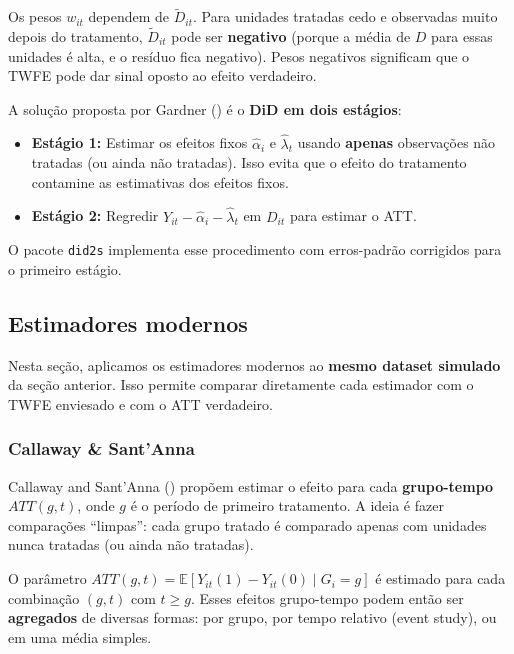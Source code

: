 \documentclass[
]{article}
\begin{document}
Os pesos \(w_{it}\) dependem de \(\tilde{D}_{it}\). Para unidades tratadas cedo e observadas muito depois do tratamento, \(\tilde{D}_{it}\) pode ser \textbf{negativo} (porque a média de \(D\) para essas unidades é alta, e o resíduo fica negativo). Pesos negativos significam que o TWFE pode dar sinal oposto ao efeito verdadeiro.

A solução proposta por Gardner () é o \textbf{DiD em dois estágios}:

\begin{itemize}
\item
  \textbf{Estágio 1:} Estimar os efeitos fixos \(\hat{\alpha}_i\) e \(\hat{\lambda}_t\) usando \textbf{apenas} observações não tratadas (ou ainda não tratadas). Isso evita que o efeito do tratamento contamine as estimativas dos efeitos fixos.
\item
  \textbf{Estágio 2:} Regredir \(Y_{it} - \hat{\alpha}_i - \hat{\lambda}_t\) em \(D_{it}\) para estimar o ATT.
\end{itemize}

O pacote \texttt{did2s} implementa esse procedimento com erros-padrão corrigidos para o primeiro estágio.

\subsection{Estimadores modernos}\label{estimadores-modernos}

Nesta seção, aplicamos os estimadores modernos ao \textbf{mesmo dataset simulado} da seção anterior. Isso permite comparar diretamente cada estimador com o TWFE enviesado e com o ATT verdadeiro.

\subsubsection{Callaway \& Sant'Anna}\label{callaway-santanna}

Callaway and Sant'Anna () propõem estimar o efeito para cada \textbf{grupo-tempo} \(ATT(g, t)\), onde \(g\) é o período de primeiro tratamento. A ideia é fazer comparações ``limpas'': cada grupo tratado é comparado apenas com unidades nunca tratadas (ou ainda não tratadas).

O parâmetro \(ATT(g, t) = \mathbb{E}[Y_{it}(1) - Y_{it}(0) \mid G_i = g]\) é estimado para cada combinação \((g, t)\) com \(t \geq g\). Esses efeitos grupo-tempo podem então ser \textbf{agregados} de diversas formas: por grupo, por tempo relativo (event study), ou em uma média simples.
\end{document}
